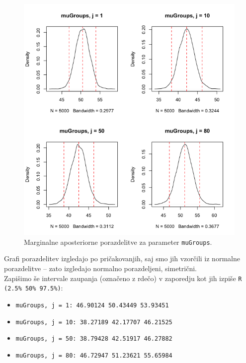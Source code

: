 \documentclass[a4paper,11pt]{article}
\begin{document}
\newpage
\begin{figure}[ht!]
    \centering
    \includegraphics[width = 150mm]{Slike/3_muGroups.png}
    \caption{Marginalne aposteriorne porazdelitve za parameter \texttt{muGroups}.}
\end{figure}
\noindent
Grafi porazdelitev izgledajo po pričakovanjih, saj smo jih vzorčili iz normalne porazdelitve -- zato izgledajo normalno porazdeljeni, simetrični.
\\
Zapišimo še intervale zaupanja (označeno z rdečo) v zaporedju kot jih izpiše \texttt{R (2.5\%       50\%     97.5\%)}:
\begin{itemize}
    \item \texttt{muGroups, j = 1: 46.90124 50.43449 53.93451  }
    \item \texttt{muGroups, j = 10: 38.27189 42.17707 46.21525  }
    \item \texttt{muGroups, j = 50: 38.79428 42.51917 46.27882  }
    \item \texttt{muGroups, j = 80: 46.72947 51.23621 55.65984  }
\end{itemize}
\end{document}
